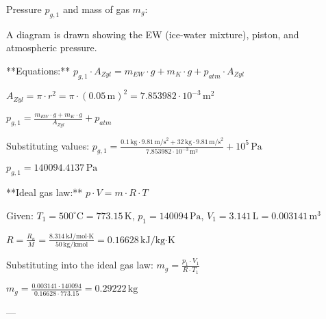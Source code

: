 Pressure \( p_{g,1} \) and mass of gas \( m_g \):  

A diagram is drawn showing the EW (ice-water mixture), piston, and atmospheric pressure.  

**Equations:**  
\( p_{g,1} \cdot A_{Zyl} = m_{EW} \cdot g + m_K \cdot g + p_{atm} \cdot A_{Zyl} \)  

\( A_{Zyl} = \pi \cdot r^2 = \pi \cdot (0.05 \, \text{m})^2 = 7.853982 \cdot 10^{-3} \, \text{m}^2 \)  

\( p_{g,1} = \frac{m_{EW} \cdot g + m_K \cdot g}{A_{Zyl}} + p_{atm} \)  

Substituting values:  
\( p_{g,1} = \frac{0.1 \, \text{kg} \cdot 9.81 \, \text{m/s}^2 + 32 \, \text{kg} \cdot 9.81 \, \text{m/s}^2}{7.853982 \cdot 10^{-3} \, \text{m}^2} + 10^5 \, \text{Pa} \)  

\( p_{g,1} = 140094.4137 \, \text{Pa} \)  

**Ideal gas law:**  
\( p \cdot V = m \cdot R \cdot T \)  

Given:  
\( T_1 = 500^\circ \text{C} = 773.15 \, \text{K} \), \( p_1 = 140094 \, \text{Pa} \), \( V_1 = 3.141 \, \text{L} = 0.003141 \, \text{m}^3 \)  

\( R = \frac{R_u}{M} = \frac{8.314 \, \text{kJ/mol·K}}{50 \, \text{kg/kmol}} = 0.16628 \, \text{kJ/kg·K} \)  

Substituting into the ideal gas law:  
\( m_g = \frac{p_1 \cdot V_1}{R \cdot T_1} \)  

\( m_g = \frac{0.003141 \cdot 140094}{0.16628 \cdot 773.15} = 0.29222 \, \text{kg} \)  

---